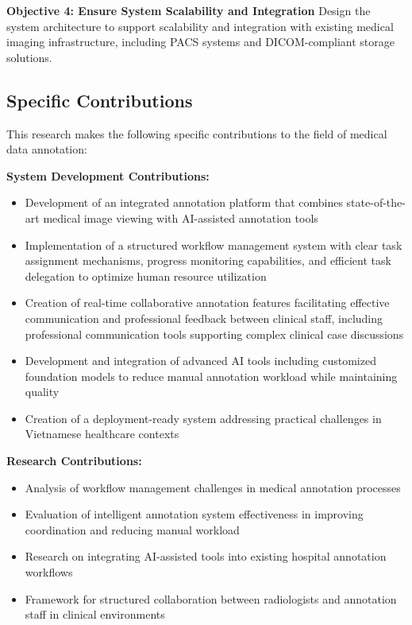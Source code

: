 \textbf{Objective 4: Ensure System Scalability and Integration}
Design the system architecture to support scalability and integration with existing medical imaging infrastructure, including PACS systems and DICOM-compliant storage solutions.

\subsection{Specific Contributions}

This research makes the following specific contributions to the field of medical data annotation:

\textbf{System Development Contributions:}
\begin{itemize}
    \item Development of an integrated annotation platform that combines state-of-the-art medical image viewing with AI-assisted annotation tools
    \item Implementation of a structured workflow management system with clear task assignment mechanisms, progress monitoring capabilities, and efficient task delegation to optimize human resource utilization
    \item Creation of real-time collaborative annotation features facilitating effective communication and professional feedback between clinical staff, including professional communication tools supporting complex clinical case discussions
    \item Development and integration of advanced AI tools including customized foundation models to reduce manual annotation workload while maintaining quality
    \item Creation of a deployment-ready system addressing practical challenges in Vietnamese healthcare contexts
\end{itemize}

\textbf{Research Contributions:}
\begin{itemize}
    \item Analysis of workflow management challenges in medical annotation processes
    \item Evaluation of intelligent annotation system effectiveness in improving coordination and reducing manual workload
    \item Research on integrating AI-assisted tools into existing hospital annotation workflows
    \item Framework for structured collaboration between radiologists and annotation staff in clinical environments
\end{itemize}

